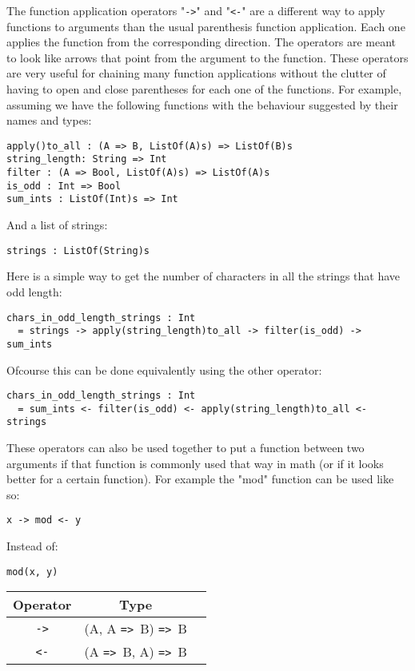 \documentclass{article}
\def\ra{\texttt{=>}\ }
\begin{document}
The function application operators "\texttt{->}" and "\texttt{<-}" are a different
way to apply functions to arguments than the usual parenthesis function application.
Each one applies the function from the corresponding direction. The operators are 
meant to look like arrows that point from the argument to the function.
These operators are very useful for chaining many function applications without the
clutter of having to open and close parentheses for each one of the functions.
For example, assuming we have the following functions with the behaviour suggested
by their names and types:
\begin{verbatim}
apply()to_all : (A => B, ListOf(A)s) => ListOf(B)s
string_length: String => Int
filter : (A => Bool, ListOf(A)s) => ListOf(A)s
is_odd : Int => Bool
sum_ints : ListOf(Int)s => Int
\end{verbatim}
And a list of strings:
\begin{verbatim}
strings : ListOf(String)s
\end{verbatim}
Here is a simple way to get the number of characters in all the strings that have 
odd length:
\begin{verbatim}
chars_in_odd_length_strings : Int
  = strings -> apply(string_length)to_all -> filter(is_odd) -> sum_ints
\end{verbatim}
Ofcourse this can be done equivalently using the other operator:
\begin{verbatim}
chars_in_odd_length_strings : Int
  = sum_ints <- filter(is_odd) <- apply(string_length)to_all <- strings

\end{verbatim}
These operators can also be used together to put a function between two arguments
if that function is commonly used that way in math (or if it looks better for a
certain function). For example the "mod" function can be used like so:
\begin{verbatim}
x -> mod <- y
\end{verbatim}
Instead of:
\begin{verbatim}
mod(x, y)
\end{verbatim}
\begin{center}
\begin{tabular}{ |c|c|c| } 
\hline
Operator & Type \\ 
\hline
\hline
\texttt{->} & (A, A \ra B) \ra B \\
\hline
\texttt{<-} & (A \ra B, A) \ra B \\
\hline
\end{tabular}
\end{center}
\end{document}
